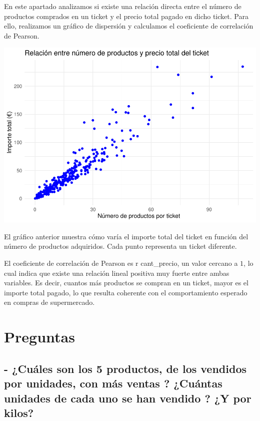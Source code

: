 \documentclass[,article,submit,moreauthors,pdftex]{Definitions/mdpi}
\begin{document}
En este apartado analizamos si existe una relación directa entre el
número de productos comprados en un ticket y el precio total pagado en
dicho ticket. Para ello, realizamos un gráfico de dispersión y
calculamos el coeficiente de correlación de Pearson.

\includegraphics[width=0.85\linewidth]{ProyectoTD2025_files/figure-latex/grafica3-1}

El gráfico anterior muestra cómo varía el importe total del ticket en
función del número de productos adquiridos. Cada punto representa un
ticket diferente.

El coeficiente de correlación de Pearson es r cant\_precio, un valor
cercano a \(1\), lo cual indica que existe una relación lineal positiva
muy fuerte entre ambas variables. Es decir, cuantos más productos se
compran en un ticket, mayor es el importe total pagado, lo que resulta
coherente con el comportamiento esperado en compras de supermercado.

\bigskip

\hypertarget{preguntas}{%
\section{Preguntas}\label{preguntas}}

\hypertarget{cuuxe1les-son-los-5-productos-de-los-vendidos-por-unidades-con-muxe1s-ventas-cuuxe1ntas-unidades-de-cada-uno-se-han-vendido-y-por-kilos}{%
\subsection{- ¿Cuáles son los 5 productos, de los vendidos por unidades,
con más ventas ? ¿Cuántas unidades de cada uno se han vendido ? ¿Y por
kilos?}\label{cuuxe1les-son-los-5-productos-de-los-vendidos-por-unidades-con-muxe1s-ventas-cuuxe1ntas-unidades-de-cada-uno-se-han-vendido-y-por-kilos}}
\end{document}
